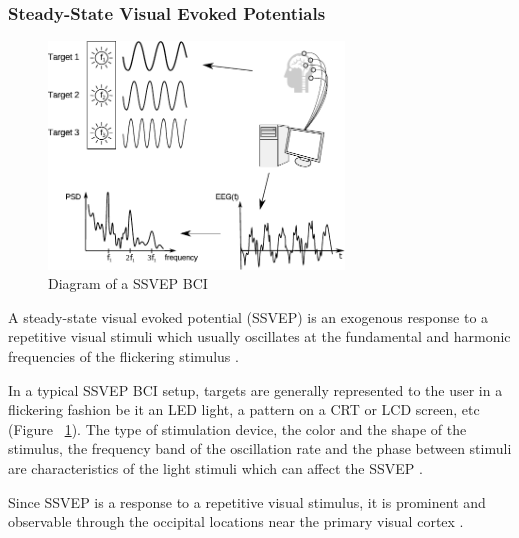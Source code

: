 \documentclass[12pt]{article}
\newcommand\mysubsubsection[1]{\subsubsection{#1}}
\numberwithin{equation}{section}
\numberwithin{figure}{section}
\numberwithin{table}{section}
\begin{document}
\newpage
\mysubsubsection{Steady-State Visual Evoked Potentials}
\par{
    \begin{figure}[ht]
        \centering
        \includegraphics[width=0.7\textwidth]{images/ssvep_diagram}
        \caption[Diagram of a SSVEP BCI]{Diagram of a SSVEP BCI \citep{chumerin_decoding_2012}}
        \label{fig:eeg_ssvep_bci}
    \end{figure}
    A steady-state visual evoked potential (SSVEP) is an exogenous response
    to a repetitive visual stimuli which usually oscillates at the fundamental
    and harmonic frequencies of the flickering stimulus \citep{wu_stimulator_2008}.
}
\par{
    In a typical SSVEP BCI setup, targets are generally represented to the user
    in a flickering fashion be it an LED light, a pattern on a CRT or LCD screen, etc (Figure ~\ref{fig:eeg_ssvep_bci}).
    The type of stimulation device, the color and the shape of the stimulus,
    the frequency band of the oscillation rate and the phase between stimuli
    are characteristics of the light stimuli which can affect the SSVEP \citep{zhu_survey_2010}.
}
\par{
    Since SSVEP is a response to a repetitive visual stimulus, it is prominent
    and observable through the occipital locations near the primary visual
    cortex \citep{herrmann_human_2001}.
}

\newpage
\end{document}
